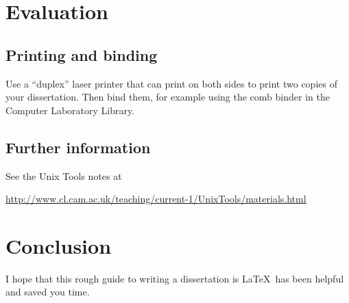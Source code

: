 \documentclass[a4paper,12pt,twoside,openright]{report}
\begin{document}
	
	\chapter{Evaluation}
	
	\section{Printing and binding}
	
	Use a ``duplex'' laser printer that can print on both sides to print
	two copies of your dissertation. Then bind them, for example using the
	comb binder in the Computer Laboratory Library.
	
	\section{Further information}
	
	See the Unix Tools notes at
	
	\url{http://www.cl.cam.ac.uk/teaching/current-1/UnixTools/materials.html}
	
	
	\chapter{Conclusion}
	
	I hope that this rough guide to writing a dissertation is \LaTeX\ has
	been helpful and saved you time.
	
	
	
	
	\appendix
	
	
	
	
	
	
\end{document}
